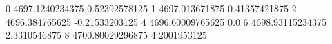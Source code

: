 0 4697.1240234375 0.52392578125
1 4697.013671875 0.41357421875
2 4696.384765625 -0.21533203125
4 4696.60009765625 0.0
6 4698.93115234375 2.3310546875
8 4700.80029296875 4.2001953125
